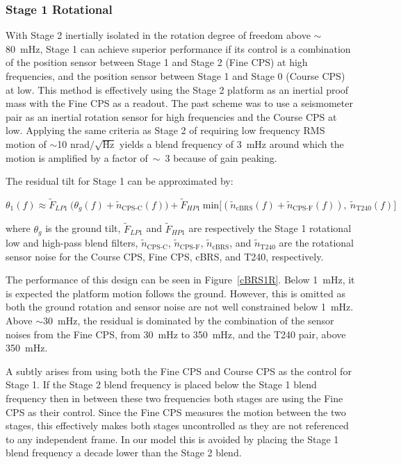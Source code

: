 \documentclass [12pt, proquest]{uwthesis}[2019]
\begin{document}
\subsubsection{Stage 1 Rotational}

With Stage 2 inertially isolated in the rotation degree of freedom above $\sim$80~mHz, Stage 1 can achieve superior performance if its control is a combination of the position sensor between Stage 1 and Stage 2 (Fine CPS) at high frequencies, and the position sensor between Stage 1 and Stage 0 (Course CPS) at low. This method is effectively using the Stage 2 platform as an inertial proof mass with the Fine CPS as a readout. The past scheme was to use a seismometer pair as an inertial rotation sensor for high frequencies and the Course CPS at low. Applying the same criteria as Stage 2 of requiring low frequency RMS motion of $\sim$10 nrad$/\sqrt{\text{Hz}}$ yields a blend frequency of 3~mHz around which the motion is amplified by a factor of~$\sim$~3 because of gain peaking. 

The residual tilt for Stage 1 can be approximated by:

\begin{equation}
\theta_1(f)\approx \tilde{F}_{LP1}\ \big(\theta_g(f)+\tilde{n}_\text{CPS-C}(f)\big)+\tilde{F}_{HP1}\ \text{min}\big[(\tilde{n}_\text{cBRS}(f)+\tilde{n}_\text{CPS-F}(f)),\ \tilde{n}_\text{T240}(f)\big]
\end{equation}

where $\theta_g$ is the ground tilt, $\tilde{F}_{LP1}$ and $\tilde{F}_{HP1}$ are respectively the Stage 1 rotational low and high-pass blend filters, $\tilde{n}_\text{CPS-C}$, $\tilde{n}_\text{CPS-F}$, $\tilde{n}_\text{cBRS}$, and $\tilde{n}_\text{T240}$ are the rotational sensor noise for the Course CPS, Fine CPS, cBRS, and T240, respectively.

The performance of this design can be seen in Figure~\ref{cBRS1R}. Below 1~mHz, it is expected the platform motion follows the ground. However, this is omitted as both the ground rotation and sensor noise are not well constrained below 1~mHz. Above $\sim$30~mHz, the residual is dominated by the combination of the sensor noises from the Fine CPS, from 30~mHz to 350~mHz, and the T240 pair, above 350~mHz.

A subtly arises from using both the Fine CPS and Course CPS as the control for Stage 1. If the Stage 2 blend frequency is placed below the Stage 1 blend frequency then in between these two frequencies both stages are using the Fine CPS as their control. Since the Fine CPS measures the motion between the two stages, this effectively makes both stages uncontrolled as they are not referenced to any independent frame. In our model this is avoided by placing the Stage 1 blend frequency a decade lower than the Stage 2 blend.
\end{document}
